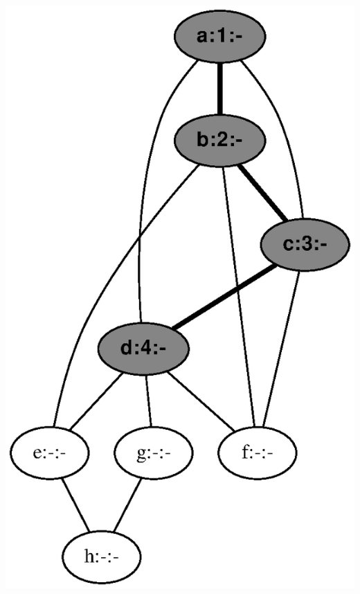 \documentclass{article}
\begin{document}
\includegraphics[height=.3\textheight]{dfs_undirected_classroom_04.eps}
\vspace{1em}
\end{document}
